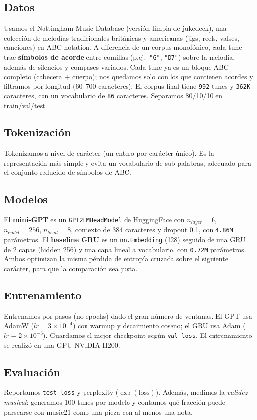\documentclass[twocolumn]{article}
\begin{document}
\subsection{Datos}
Usamos el Nottingham Music Database (versión limpia de jukedeck),
una colección de melodías tradicionales británicas y americanas (jigs, reels,
valses, canciones) en ABC notation. A diferencia de un corpus monofónico, cada
tune trae \textbf{símbolos de acorde} entre comillas (p.ej.\ \texttt{"G"},
\texttt{"D7"}) sobre la melodía, además de silencios y compases variados. Cada
tune ya es un bloque ABC completo (cabecera + cuerpo); nos quedamos solo con los
que contienen acordes y filtramos por longitud (60--700 caracteres). El corpus
final tiene \texttt{992} tunes y \texttt{362K} caracteres, con un vocabulario de
\texttt{86} caracteres. Separamos 80/10/10 en train/val/test.

\subsection{Tokenización}
Tokenizamos a nivel de carácter (un entero por carácter único). Es la
representación más simple y evita un vocabulario de sub-palabras, adecuado para
el conjunto reducido de símbolos de ABC.

\subsection{Modelos}
El \textbf{mini-GPT} es un \texttt{GPT2LMHeadModel} de HuggingFace con
$n_{layer}=6$, $n_{embd}=256$, $n_{head}=8$, contexto de 384 caracteres y
dropout 0.1, con \texttt{4.86M} parámetros. El \textbf{baseline GRU} es un
\texttt{nn.Embedding} (128) seguido de una GRU de 2 capas (hidden 256) y una capa
lineal a vocabulario, con \texttt{0.72M} parámetros. Ambos optimizan la misma
pérdida de entropía cruzada sobre el siguiente carácter, para que la comparación
sea justa.

\subsection{Entrenamiento}
Entrenamos por pasos (no epochs) dado el gran número de ventanas. El GPT usa
AdamW ($lr=3\times10^{-4}$) con warmup y decaimiento coseno; el GRU usa Adam
($lr=2\times10^{-3}$). Guardamos el mejor checkpoint según \texttt{val\_loss}.
El entrenamiento se realizó en una GPU NVIDIA H200.

\subsection{Evaluación}
Reportamos \texttt{test\_loss} y perplexity ($\exp(\text{loss})$). Además, medimos
la \emph{validez musical}: generamos 100 tunes por modelo y contamos qué fracción
puede parsearse con music21 como una pieza con al menos
una nota.
\end{document}
